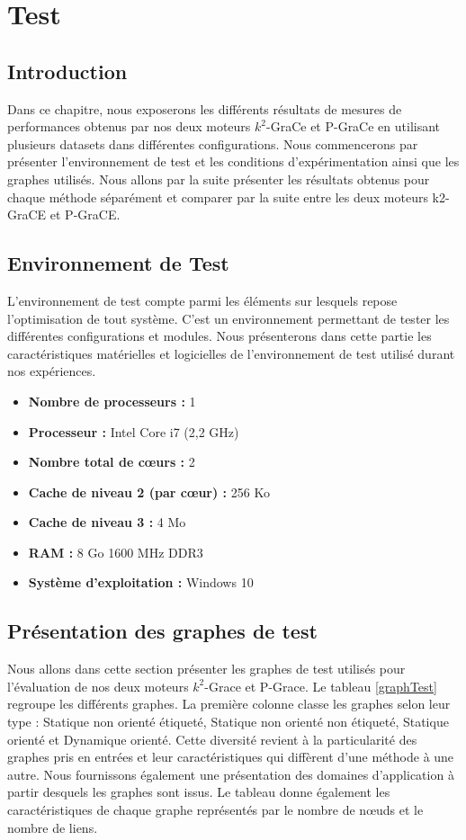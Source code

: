 \chapter{Test}
	\section{Introduction}
	
Dans ce chapitre, nous exposerons les différents résultats de mesures de performances obtenus par nos deux moteurs $k^2$-GraCe et P-GraCe en utilisant plusieurs datasets dans différentes configurations. Nous commencerons par présenter l'environnement de test et les conditions d'expérimentation ainsi que les graphes utilisés. Nous allons par la suite présenter les résultats obtenus pour chaque méthode séparément et comparer par la suite entre les deux moteurs k2-GraCE et P-GraCE. 


	
	
	\section{Environnement de Test}
	L'environnement de test compte parmi les éléments sur lesquels repose l'optimisation de tout système. C'est un environnement permettant de tester les différentes configurations et modules. Nous présenterons dans cette partie les caractéristiques matérielles et logicielles de l'environnement de test utilisé durant nos expériences. 

	
	\begin{itemize}[label=$\bullet$]
		\item \textbf{Nombre de processeurs :}	1
		\item \textbf{Processeur :} Intel Core i7 (2,2 GHz)
  		\item \textbf{Nombre total de cœurs :}	2
  		\item \textbf{Cache de niveau 2 (par cœur) :}	256 Ko
  		\item \textbf{Cache de niveau 3 :}	4 Mo
		\item \textbf{RAM : } 8 Go 1600 MHz DDR3
		\item \textbf{Système d'exploitation : } Windows 10
	\end{itemize}
	\section{Présentation des graphes de test}
	Nous allons dans cette section présenter les graphes de test utilisés pour l'évaluation de nos deux moteurs $k^2$-Grace et P-Grace. 
	 Le tableau \ref{graphTest} regroupe les différents graphes. La première colonne classe les graphes selon leur type : Statique non orienté étiqueté, Statique non orienté non étiqueté, Statique  orienté et Dynamique orienté. Cette diversité revient à la particularité des graphes pris en entrées et leur caractéristiques qui diffèrent d'une méthode à une autre.
Nous fournissons également une présentation des domaines d'application à partir desquels  les graphes sont issus. Le tableau donne également les caractéristiques de chaque graphe représentés par le nombre de nœuds et le nombre de liens. 
	 

